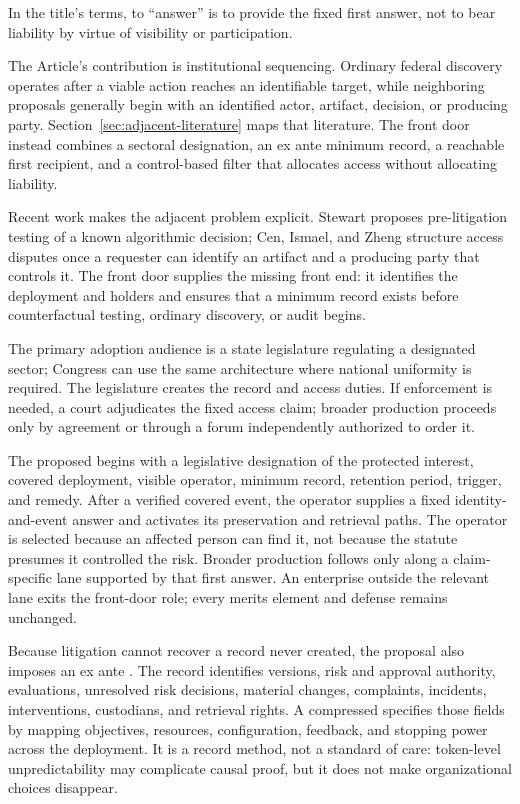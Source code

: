 In the title's terms, to ``answer'' is to provide the fixed first answer, not to bear liability by virtue of visibility or participation.

The Article's contribution is institutional sequencing. Ordinary federal discovery operates after a viable action reaches an identifiable target, while neighboring proposals generally begin with an identified actor, artifact, decision, or producing party. Section~\ref{sec:adjacent-literature} maps that literature. The front door instead combines a sectoral designation, an ex ante minimum record, a reachable first recipient, and a control-based filter that allocates access without allocating liability.

Recent work makes the adjacent problem explicit. Stewart proposes pre-litigation testing of a known algorithmic decision; Cen, Ismael, and Zheng structure access disputes once a requester can identify an artifact and a producing party that controls it. The front door supplies the missing front end: it identifies the deployment and holders and ensures that a minimum record exists before counterfactual testing, ordinary discovery, or audit begins.

The primary adoption audience is a state legislature regulating a designated sector; Congress can use the same architecture where national uniformity is required. The legislature creates the record and access duties. If enforcement is needed, a court adjudicates the fixed access claim; broader production proceeds only by agreement or through a forum independently authorized to order it.

The proposed  begins with a legislative designation of the protected interest, covered deployment, visible operator, minimum record, retention period, trigger, and remedy. After a verified covered event, the operator supplies a fixed identity-and-event answer and activates its preservation and retrieval paths. The operator is selected because an affected person can find it, not because the statute presumes it controlled the risk. Broader production follows only along a claim-specific lane supported by that first answer. An enterprise outside the relevant lane exits the front-door role; every merits element and defense remains unchanged.

Because litigation cannot recover a record never created, the proposal also imposes an ex ante . The record identifies versions, risk and approval authority, evaluations, unresolved risk decisions, material changes, complaints, incidents, interventions, custodians, and retrieval rights. A compressed  specifies those fields by mapping objectives, resources, configuration, feedback, and stopping power across the deployment. It is a record method, not a standard of care: token-level unpredictability may complicate causal proof, but it does not make organizational choices disappear.

